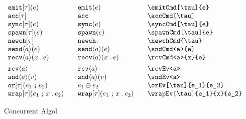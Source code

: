 \documentclass[11pt]{article}
\begin{document}
\begin{figure}
  \begin{small}
    \begin{displaymath}
      \begin{array}{l@{\qquad}l@{\qquad}l@{\qquad}l}
        \emitCmd[\tau]{e}     & \emitCmd*{e}        & \verb|\emitCmd[\tau]{e}| \\
        \accCmd[\tau]         & \accCmd*{}          & \verb|\accCmd[\tau]| \\
        \syncCmd[\tau]{e}     & \syncCmd*{e}        & \verb|\syncCmd[\tau]{e}| \\
        \spawnCmd[\tau]{e}    & \spawnCmd*{e}       & \verb|\spawnCmd[\tau]{e}| \\
        \newchCmd{\tau}       & \newchCmd*{\tau}    & \verb|\newchCmd{\tau}| \\
        \sndCmd<a>{e}         & \sndCmd*<a>{e}      & \verb|\sndCmd<a>{e}| \\
        \rcvCmd<a>{x}{e}      & \rcvCmd*<a>{x}{e}   & \verb|\rcvCmd<a>{x}{e}| \\[1ex]
        \rcvEv<a>             & \rcvEv*<a>          & \verb|\rcvEv<a>| \\
        \sndEv<a>{v}          & \sndEv*<a>{v}       & \verb|\sndEv<a>| \\
        \orEv[\tau]{e_1}{e_2}       & \orEv*{e_1}{e_2}    & \verb|\orEv[\tau]{e_1}{e_2}| \\
        \wrapEv[\tau]{e_1}{x}{e_2}  & \wrapEv*{e_1}{x}{e_2} & \verb|\wrapEv[\tau]{e_1}{x}{e_2}|
      \end{array}
    \end{displaymath}
  \end{small}
  \caption{Concurrent Algol}
  \label{fig:conc}
\end{figure}
\end{document}
